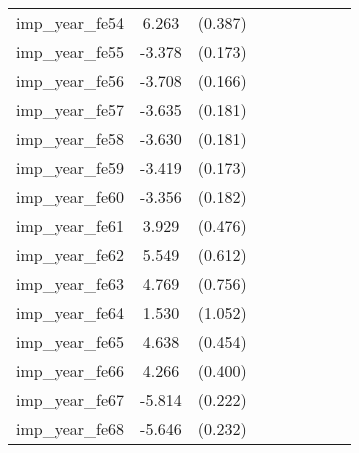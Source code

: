 {\begin{tabular}{l*{4}{cc}}
imp\_year\_fe54&    6.263\sym{***}&  (0.387)&                  &         &                  &         &                  &         \\
imp\_year\_fe55&   -3.378\sym{***}&  (0.173)&                  &         &                  &         &                  &         \\
imp\_year\_fe56&   -3.708\sym{***}&  (0.166)&                  &         &                  &         &                  &         \\
imp\_year\_fe57&   -3.635\sym{***}&  (0.181)&                  &         &                  &         &                  &         \\
imp\_year\_fe58&   -3.630\sym{***}&  (0.181)&                  &         &                  &         &                  &         \\
imp\_year\_fe59&   -3.419\sym{***}&  (0.173)&                  &         &                  &         &                  &         \\
imp\_year\_fe60&   -3.356\sym{***}&  (0.182)&                  &         &                  &         &                  &         \\
imp\_year\_fe61&    3.929\sym{***}&  (0.476)&                  &         &                  &         &                  &         \\
imp\_year\_fe62&    5.549\sym{***}&  (0.612)&                  &         &                  &         &                  &         \\
imp\_year\_fe63&    4.769\sym{***}&  (0.756)&                  &         &                  &         &                  &         \\
imp\_year\_fe64&    1.530         &  (1.052)&                  &         &                  &         &                  &         \\
imp\_year\_fe65&    4.638\sym{***}&  (0.454)&                  &         &                  &         &                  &         \\
imp\_year\_fe66&    4.266\sym{***}&  (0.400)&                  &         &                  &         &                  &         \\
imp\_year\_fe67&   -5.814\sym{***}&  (0.222)&                  &         &                  &         &                  &         \\
imp\_year\_fe68&   -5.646\sym{***}&  (0.232)&                  &         &                  &         &                  &         \\

\end{tabular}}
